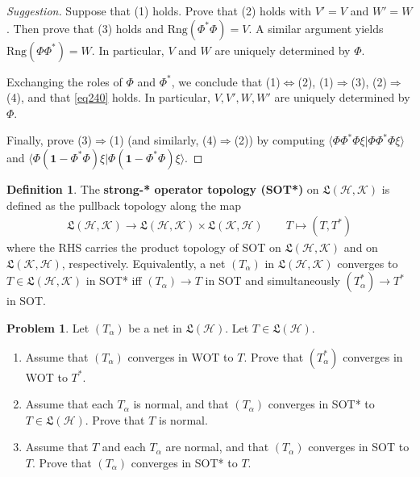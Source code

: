\documentclass[12pt,b5paper,notitlepage]{article}
\theoremstyle{definition}
\newtheorem{df}{Definition}[subsection]
\newtheorem{prob}{\color{red}Problem}[section]
\theoremstyle{plain}
\newcommand{\fk}{\mathfrak}
\newcommand{\idt}{\mathbf{1}}
\newcommand{\bk}[1]{\langle {#1}\rangle}
\newcommand{\Rng}{\mathrm{Rng}}
\newcommand{\MH}{\mathcal H}
\newcommand{\MK}{\mathcal K}
\numberwithin{equation}{section}
\begin{document}
\begin{proof}[Suggestion]
Suppose that (1) holds. Prove that (2) holds with $V'=V$ and $W'=W$. Then prove that (3) holds and $\Rng(\Phi^*\Phi)=V$. A similar argument yields $\Rng(\Phi\Phi^*)=W$. In particular, $V$ and $W$ are uniquely determined by $\Phi$.

Exchanging the roles of $\Phi$ and $\Phi^*$, we conclude that (1)$\Leftrightarrow$(2), (1)$\Rightarrow$(3), (2)$\Rightarrow$(4), and that \eqref{eq240} holds. In particular, $V,V',W,W'$ are uniquely determined by $\Phi$.

Finally, prove (3)$\Rightarrow$(1) (and similarly, (4)$\Rightarrow$(2)) by computing $\bk{\Phi\Phi^*\Phi\xi|\Phi\Phi^*\Phi\xi}$ and $\bk{\Phi(\idt-\Phi^*\Phi)\xi|\Phi(\idt-\Phi^*\Phi)\xi}$.
\end{proof}




\begin{df}
The \textbf{strong-* operator topology (SOT*)}   on $\fk L(\MH,\MK)$ is defined as the pullback topology along the map
\begin{align*}
\fk L(\MH,\MK)\rightarrow\fk L(\MH,\MK)\times\fk L(\MK,\MH)\qquad T\mapsto (T,T^*)
\end{align*}
where the RHS carries the product topology of SOT on $\fk L(\MH,\MK)$ and on $\fk L(\MK,\MH)$, respectively. Equivalently, a net $(T_\alpha)$ in $\fk L(\MH,\MK)$ converges to $T\in\fk L(\MH,\MK)$ in SOT* iff $(T_\alpha)\rightarrow T$ in SOT and simultaneously $(T_\alpha^*)\rightarrow T^*$ in SOT.
\end{df}




\begin{prob}\label{lb337}
Let $(T_\alpha)$ be a net in $\fk L(\MH)$. Let $T\in\fk L(\MH)$. 
\begin{enumerate}
\item Assume that $(T_\alpha)$ converges in WOT to $T$. Prove that $(T_\alpha^*)$ converges in WOT to $T^*$.
\item Assume that each $T_\alpha$ is normal, and that $(T_\alpha)$ converges in SOT* to $T\in\fk L(\MH)$. Prove that $T$ is normal.
\item Assume that $T$ and each $T_\alpha$ are normal, and that $(T_\alpha)$ converges in SOT to $T$. Prove that $(T_\alpha)$ converges in SOT* to $T$.
\end{enumerate}
\end{prob}
\end{document}
